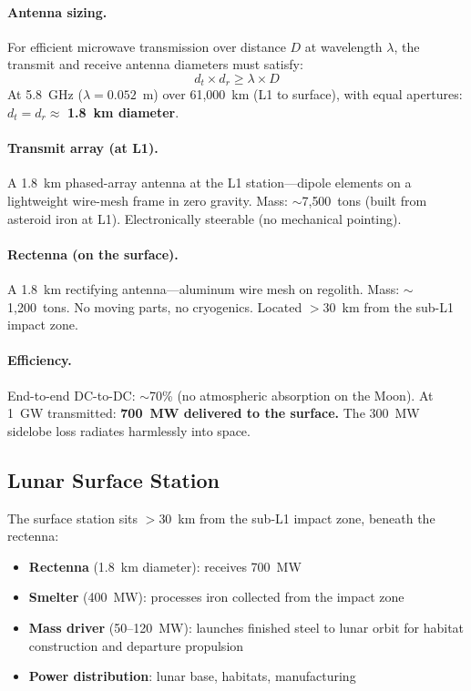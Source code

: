 \documentclass[12pt,letterpaper]{article}
\begin{document}
\paragraph{Antenna sizing.}
For efficient microwave transmission over distance $D$ at wavelength $\lambda$, the transmit and receive antenna diameters must satisfy:
\begin{equation}
d_t \times d_r \geq \lambda \times D
\end{equation}
At 5.8~GHz ($\lambda = 0.052$~m) over 61{,}000~km (L1 to surface), with equal apertures: $d_t = d_r \approx$ \textbf{1.8~km diameter}.

\paragraph{Transmit array (at L1).}
A 1.8~km phased-array antenna at the L1 station---dipole elements on a lightweight wire-mesh frame in zero gravity. Mass: ${\sim}$7{,}500~tons (built from asteroid iron at L1). Electronically steerable (no mechanical pointing).

\paragraph{Rectenna (on the surface).}
A 1.8~km rectifying antenna---aluminum wire mesh on regolith. Mass: ${\sim}$1{,}200~tons. No moving parts, no cryogenics. Located $>$30~km from the sub-L1 impact zone.

\paragraph{Efficiency.}
End-to-end DC-to-DC: ${\sim}$70\% (no atmospheric absorption on the Moon). At 1~GW transmitted: \textbf{700~MW delivered to the surface.} The 300~MW sidelobe loss radiates harmlessly into space.

\subsection{Lunar Surface Station}

The surface station sits $>$30~km from the sub-L1 impact zone, beneath the rectenna:

\begin{itemize}[nosep]
\item \textbf{Rectenna} (1.8~km diameter): receives 700~MW
\item \textbf{Smelter} (400~MW): processes iron collected from the impact zone
\item \textbf{Mass driver} (50--120~MW): launches finished steel to lunar orbit for habitat construction and departure propulsion
\item \textbf{Power distribution}: lunar base, habitats, manufacturing
\end{itemize}
\end{document}
